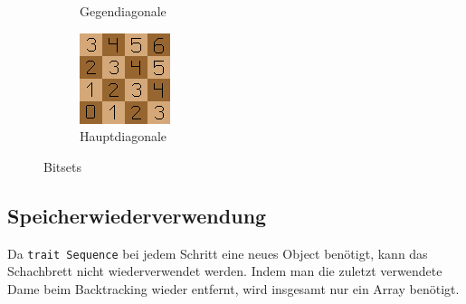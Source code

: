 \begin{figure}
\begin{subfigure}{0.3\linewidth}
    \caption{Gegendiagonale}
  \end{subfigure}
  \begin{subfigure}{0.3\linewidth}
    \includegraphics[width=\linewidth]{../img/right_diagonals.png}
    \caption{Hauptdiagonale}
  \end{subfigure}
  \caption{Bitsets}
  \label{bitsets}
\end{figure}

\subsection{Speicherwiederverwendung}
Da \texttt{trait Sequence} bei jedem Schritt eine neues Object benötigt, kann das
Schachbrett nicht wiederverwendet werden. Indem man die zuletzt verwendete Dame beim Backtracking
wieder entfernt, wird insgesamt nur ein Array benötigt.

